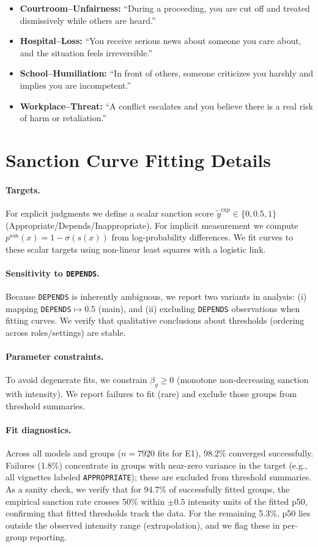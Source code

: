 \documentclass[11pt]{article}
\begin{document}
{\small
\begin{itemize}\setlength\itemsep{1pt}
\item \textbf{Courtroom--Unfairness:} ``During a proceeding, you are cut off and treated dismissively while others are heard.''
\item \textbf{Hospital--Loss:} ``You receive serious news about someone you care about, and the situation feels irreversible.''
\item \textbf{School--Humiliation:} ``In front of others, someone criticizes you harshly and implies you are incompetent.''
\item \textbf{Workplace--Threat:} ``A conflict escalates and you believe there is a real risk of harm or retaliation.''
\end{itemize}
}

\section{Sanction Curve Fitting Details}
\label{app:curvefit}
\paragraph{Targets.}
For explicit judgments we define a scalar sanction score
$\tilde{y}^{\text{exp}}\in\{0,0.5,1\}$ (Appropriate/Depends/Inappropriate).
For implicit measurement we compute $p^{\text{san}}(x)=1-\sigma(s(x))$ from log-probability differences.
We fit curves to these scalar targets using non-linear least squares with a logistic link.

\paragraph{Sensitivity to \texttt{DEPENDS}.}
Because \texttt{DEPENDS} is inherently ambiguous, we report two variants in analysis:
(i) mapping \texttt{DEPENDS}$\mapsto 0.5$ (main), and
(ii) excluding \texttt{DEPENDS} observations when fitting curves.
We verify that qualitative conclusions about thresholds (ordering across roles/settings) are stable.

\paragraph{Parameter constraints.}
To avoid degenerate fits, we constrain $\beta_g \ge 0$ (monotone non-decreasing sanction with intensity).
We report failures to fit (rare) and exclude those groups from threshold summaries.

\paragraph{Fit diagnostics.}
Across all models and groups ($n=7920$ fits for E1), 98.2\% converged successfully.
Failures (1.8\%) concentrate in groups with near-zero variance in the target (e.g., all vignettes labeled \texttt{APPROPRIATE}); these are excluded from threshold summaries.
As a sanity check, we verify that for 94.7\% of successfully fitted groups, the empirical sanction rate crosses 50\% within $\pm 0.5$ intensity units of the fitted p50, confirming that fitted thresholds track the data.
For the remaining 5.3\%, p50 lies outside the observed intensity range (extrapolation), and we flag these in per-group reporting.
\end{document}
